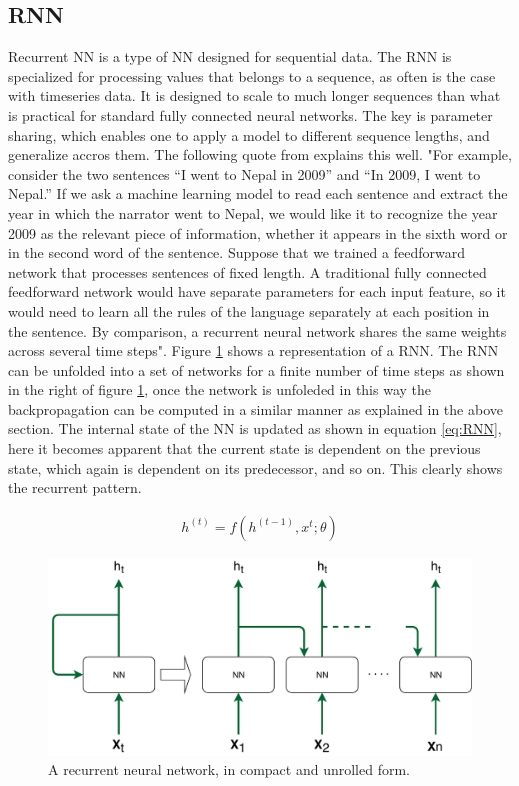     
    \subsection{RNN}\label{subsubsec:RNN}
        Recurrent NN is a type of NN designed for sequential data. The RNN is specialized for processing values that belongs to a sequence, as often is the case with timeseries data. It is designed to scale to much longer sequences than what is practical for standard fully connected neural networks. The key is parameter sharing, which enables one to apply a model to different sequence lengths, and generalize accros them. The following quote from \cite{Courville2016} explains this well. "For example, consider the two sentences “I went to Nepal in 2009” and “In 2009, I went to Nepal.” If we ask a machine learning model to read each sentence and extract the year in which the narrator went to Nepal, we would like it to recognize the year 2009 as the relevant piece of information, whether it appears in the sixth word or in the second word of the sentence. Suppose that we trained a feedforward network that processes sentences of fixed length. A traditional fully connected feedforward network would have separate parameters for each input feature, so it would need to learn all the rules of the language separately at each position in the sentence. By comparison, a recurrent neural network shares the same weights across several time steps". Figure \ref{fig:RNN} shows a representation of a RNN. The RNN can be unfolded into a set of networks for a finite number of time steps as shown in the right of figure \ref{fig:RNN}, once the network is unfoleded in this way the backpropagation can be computed in a similar manner as explained in the above section. The internal state of the NN is updated as shown in equation \ref{eq:RNN}, here it becomes apparent that the current state is dependent on the previous state, which again is dependent on its predecessor, and so on. This clearly shows the recurrent pattern. 
        
        
        \begin{align}
            h^{(t)} = f(h^{(t-1)},x^t;\theta) 
            \label{eq:RNN}
        \end{align}
        
        \begin{figure}
            \centering
            \includegraphics[width=\textwidth]{report/figures/techniques/RNN.pdf}
            \caption{A recurrent neural network, in compact and unrolled form.}
            \label{fig:RNN}
        \end{figure}
    
